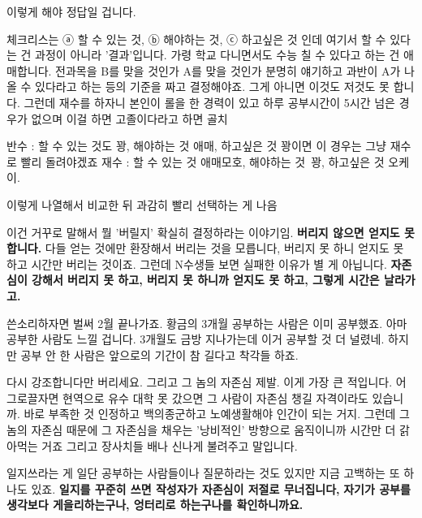 이렇게 해야 정답일 겁니다.
\vspace{5mm}

체크리스는 ⓐ 할 수 있는 것, ⓑ 해야하는 것, ⓒ 하고싶은 것 인데
여기서 할 수 있다는 건 과정이 아니라 '결과'입니다.
가령 학교 다니면서도 수능 칠 수 있다고 하는 건 애매합니다.
전과목을 B를 맞을 것인가 A를 맞을 것인가 분명히 얘기하고 과반이 A가 나올 수 있다라고 하는 등의 기준을 짜고 결정해야죠.
그게 아니면 이것도 저것도 못 합니다.
그런데 재수를 하자니 본인이 롤을 한 경력이 있고 하루 공부시간이 5시간 넘은 경우가 없으며 이걸 하면 고졸이다라고 하면 골치
\vspace{5mm}

반수 : 할 수 있는 것도 꽝, 해야하는 것 애매, 하고싶은 것 꽝이면 이 경우는 그냥 재수로 빨리 돌려야겠죠
재수 : 할 수 있는 것 애매모호, 해야하는 것 꽝, 하고싶은 것 오케이.
\vspace{5mm}

이렇게 나열해서 비교한 뒤 과감히 빨리 선택하는 게 나음
\vspace{5mm}

이건 거꾸로 말해서 뭘 '버릴지' 확실히 결정하라는 이야기임. \textbf{버리지 않으면 얻지도 못 합니다.}
다들 얻는 것에만 환장해서 버리는 것을 모릅니다, 버리지 못 하니 얻지도 못 하고 시간만 버리는 것이죠.
그런데 N수생들 보면 실패한 이유가 별 게 아닙니다.
\textbf{자존심이 강해서 버리지 못 하고, 버리지 못 하니까 얻지도 못 하고, 그렇게 시간은 날라가고.}
\vspace{5mm}

쓴소리하자면 벌써 2월 끝나가죠. 황금의 3개월 공부하는 사람은 이미 공부했죠.
아마 공부한 사람도 느낄 겁니다. 3개월도 금방 지나가는데 이거 공부할 것 더 널렸네.
하지만 공부 안 한 사람은 앞으로의 기간이 참 길다고 착각들 하죠.
\vspace{5mm}

다시 강조합니다만 버리세요. 그리고 그 놈의 자존심 제발.
이게 가장 큰 적입니다.
어그로끌자면 현역으로 유수 대학 못 갔으면 그 사람이 자존심 챙길 자격이라도 있습니까.
바로 부족한 것 인정하고 백의종군하고 노예생활해야 인간이 되는 거지.
그런데 그 놈의 자존심 때문에 그 자존심을 채우는 '낭비적인' 방향으로 움직이니까 시간만 더 갉아먹는 거죠
그리고 장사치들 배나 신나게 불려주고 말입니다.
\vspace{5mm}

일지쓰라는 게 일단 공부하는 사람들이나 질문하라는 것도 있지만
지금 고백하는 또 하나도 있죠.
\textbf{일지를 꾸준히 쓰면 작성자가 자존심이 저절로 무너집니다,}
\textbf{자기가 공부를 생각보다 게을리하는구나, 엉터리로 하는구나를 확인하니까요.}
\vspace{5mm}






